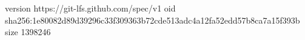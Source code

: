 version https://git-lfs.github.com/spec/v1
oid sha256:1e80082d89d39296c33f309363b72cde513adc4a12fa52edd57b8ca7a15f393b
size 1398246
